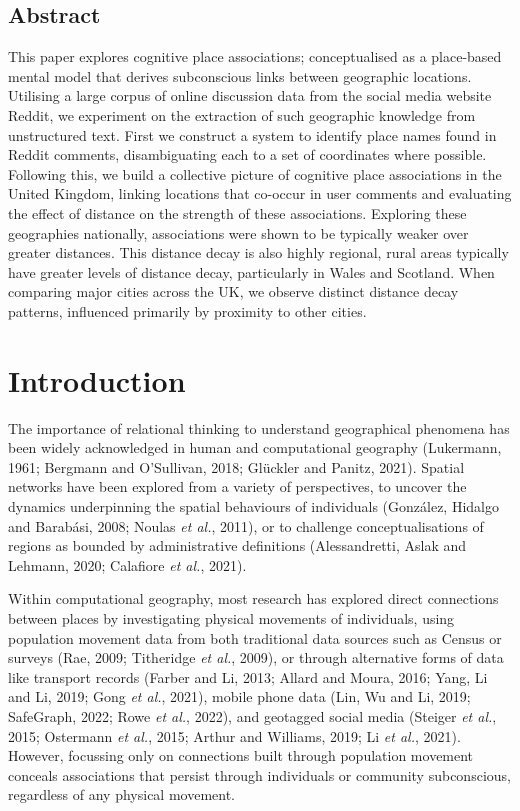 \documentclass[
  letterpaper,
  11pt,
  english,
  onehalfspacing,
  headsepline]{MastersDoctoralThesis}
\begin{document}
\hypertarget{abstract-2}{%
\subsection*{Abstract}\label{abstract-2}}

This paper explores cognitive place associations; conceptualised as a
place-based mental model that derives subconscious links between
geographic locations. Utilising a large corpus of online discussion data
from the social media website Reddit, we experiment on the extraction of
such geographic knowledge from unstructured text. First we construct a
system to identify place names found in Reddit comments, disambiguating
each to a set of coordinates where possible. Following this, we build a
collective picture of cognitive place associations in the United
Kingdom, linking locations that co-occur in user comments and evaluating
the effect of distance on the strength of these associations. Exploring
these geographies nationally, associations were shown to be typically
weaker over greater distances. This distance decay is also highly
regional, rural areas typically have greater levels of distance decay,
particularly in Wales and Scotland. When comparing major cities across
the UK, we observe distinct distance decay patterns, influenced
primarily by proximity to other cities.

\hypertarget{sec-introduction}{%
\section{Introduction}\label{sec-introduction}}

The importance of relational thinking to understand geographical
phenomena has been widely acknowledged in human and computational
geography (Lukermann, 1961; Bergmann and O'Sullivan, 2018; Glückler and
Panitz, 2021). Spatial networks have been explored from a variety of
perspectives, to uncover the dynamics underpinning the spatial
behaviours of individuals (González, Hidalgo and Barabási, 2008; Noulas
\emph{et al.}, 2011), or to challenge conceptualisations of regions as
bounded by administrative definitions (Alessandretti, Aslak and Lehmann,
2020; Calafiore \emph{et al.}, 2021).

Within computational geography, most research has explored direct
connections between places by investigating physical movements of
individuals, using population movement data from both traditional data
sources such as Census or surveys (Rae, 2009; Titheridge \emph{et al.},
2009), or through alternative forms of data like transport records
(Farber and Li, 2013; Allard and Moura, 2016; Yang, Li and Li, 2019;
Gong \emph{et al.}, 2021), mobile phone data (Lin, Wu and Li, 2019;
SafeGraph, 2022; Rowe \emph{et al.}, 2022), and geotagged social media
(Steiger \emph{et al.}, 2015; Ostermann \emph{et al.}, 2015; Arthur and
Williams, 2019; Li \emph{et al.}, 2021). However, focussing only on
connections built through population movement conceals associations that
persist through individuals or community subconscious, regardless of any
physical movement.
\end{document}
